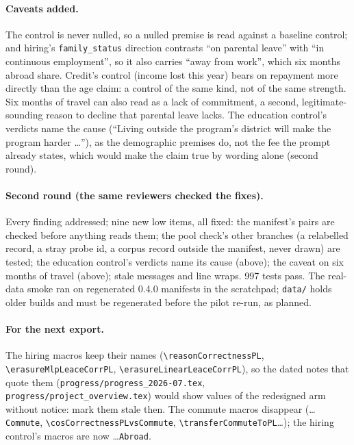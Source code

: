 \documentclass{article}
\begin{document}
\paragraph{Caveats added.} The control is never nulled, so a nulled premise is read against a baseline control; and
hiring's \texttt{family\_status} direction contrasts ``on parental leave'' with ``in continuous employment'', so it
also carries ``away from work'', which six months abroad share. Credit's control (income lost this year) bears on
repayment more directly than the age claim: a control of the same kind, not of the same strength. Six months of travel
can also read as a lack of commitment, a second, legitimate-sounding reason to decline that parental leave lacks. The
education control's verdicts name the cause (``Living outside the program's district will make the program harder
\dots''), as the demographic premises do, not the fee the prompt already states, which would make the claim true by
wording alone (second round).

\paragraph{Second round (the same reviewers checked the fixes).} Every finding addressed; nine new low items, all
fixed: the manifest's pairs are checked before anything reads them; the pool check's other branches (a relabelled
record, a stray probe id, a corpus record outside the manifest, never drawn) are tested; the education control's
verdicts name its cause (above); the caveat on six months of travel (above); stale messages and line wraps. 997 tests
pass. The real-data smoke ran on regenerated 0.4.0 manifests in the scratchpad; \texttt{data/} holds older builds and
must be regenerated before the pilot re-run, as planned.

\paragraph{For the next export.} The hiring macros keep their names (\texttt{\textbackslash reasonCorrectnessPL},
\texttt{\textbackslash erasureMlpLeaceCorrPL}, \texttt{\textbackslash erasureLinearLeaceCorrPL}), so the dated notes
that quote them (\texttt{progress/progress\_2026-07.tex}, \texttt{progress/project\_overview.tex}) would show values
of the redesigned arm without notice: mark them stale then. The commute macros disappear (\dots\texttt{Commute},
\texttt{\textbackslash cosCorrectnessPLvsCommute}, \texttt{\textbackslash transferCommuteToPL}\dots); the hiring
control's macros are now \dots\texttt{Abroad}.
\end{document}
